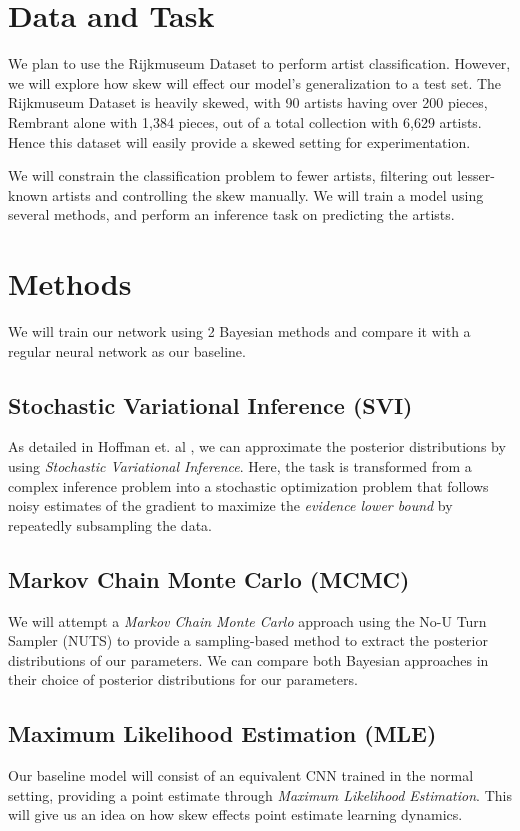 \documentclass{article}
\begin{document}
\section{Data and Task}
We plan to use the Rijkmuseum Dataset \cite{Rijksmuseum} to perform artist
classification. However, we will explore how skew will effect our model's
generalization to a test set. The Rijkmuseum Dataset is heavily skewed,
with 90 artists having over 200 pieces, Rembrant alone with 1,384 pieces, out of
a total collection with 6,629 artists. Hence this dataset will easily provide a
skewed setting for experimentation.

We will constrain the classification problem to fewer artists, filtering out
lesser-known artists and controlling the skew manually. We will train a model
using several methods, and perform an inference task on predicting the artists.

\section{Methods}
We will train our network using 2 Bayesian methods and compare it with a regular
neural network as our baseline.
\subsection{Stochastic Variational Inference (SVI)}
As detailed in Hoffman et. al \cite{SVI}, we can approximate the posterior
distributions by using \textit{Stochastic Variational Inference}. Here, the
task is transformed from a complex inference problem into a stochastic
optimization problem that follows noisy estimates of the gradient to
maximize the \textit{evidence lower bound} by repeatedly subsampling the data.
\subsection{Markov Chain Monte Carlo (MCMC)}
We will attempt a \textit{Markov Chain Monte Carlo} approach using the No-U Turn Sampler
(NUTS) \cite{NUTS} to provide a sampling-based method to extract the posterior
distributions of our parameters. We can compare both Bayesian approaches in
their choice of posterior distributions for our parameters.
\subsection{Maximum Likelihood Estimation (MLE)}
Our baseline model will consist of an equivalent CNN trained in the normal setting,
providing a point estimate through \textit{Maximum Likelihood Estimation}.
This will give us an idea on how skew effects point estimate learning dynamics.
\end{document}
